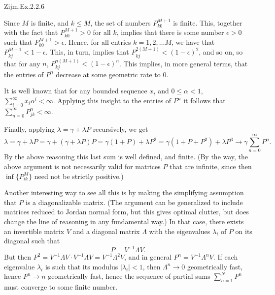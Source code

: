 \begin{question}
Zijm.Ex.2.2.6
\begin{solution}
  Since $M$ is finite, and $k\leq M$, the set of numbers
  $P^{M+1}_{k0}$ is finite. This, together with the fact that
  $P^{M+1}_{k0}>0$ for all $k$, implies that there is some number
  $\epsilon>0$ such that $P^{M+1}_{k0}>\epsilon$. Hence, for all
  entries $k=1, 2, \ldots M$, we have that
  $P^{M+1}_{kj} < 1- \epsilon$. This, in turn, implies that
  $P^{2(M+1)}_{kj} < (1- \epsilon)^2$, and so on, so that for any $n$,
  $P^{n(M+1)}_{kj} < (1- \epsilon)^n$. This implies, in more general
  terms, that the entries of $P^n$ decrease at some geometric rate to
  $0$.

  It is well known that for any bounded sequence $x_i$ and
  $0\leq \alpha < 1$, $ \sum_{i=0}^\infty x_i \alpha^i <
  \infty$. Applying this insight to the entries of $P^n$ it follows that 
$\sum_{n=0}^\infty P^n_{jk} < \infty$. 

Finally, applying  $\lambda = \gamma + \lambda P$ recursively, we get
\begin{equation*}
  \lambda = \gamma + \lambda P = \gamma + (\gamma + \lambda P)P = \gamma (1+P) + \lambda P^2 = \gamma(1+P+P^2) + \lambda P^3 \to \gamma \sum_{n=0}^\infty P^n.
\end{equation*}
By the above reasoning this last sum is well defined, and finite.  (By
the way, the above argument is not necessarily valid for matrices $P$
that are infinite, since then $\inf\{P^{M}_{ik}\}$ need not be
strictly positive.)

Another interesting way to see all this is by making the simplifying
assumption that $P$ is a diagonalizable matrix. (The argument can be
generalized to include matrices reduced to Jordan normal form, but
this gives optimal clutter, but does change the line of reasoning in
any fundamental way.) In that case, there exists an invertible matrix $V$ and a diagonal matrix $\Lambda$ with the eigenvalues $\lambda_i$ of $P$ on its diagonal such that 
\begin{equation*}
  P = V^{-1}\Lambda V.
\end{equation*}
But then
$P^2 = V^{-1}\Lambda V \cdot V^{-1}\Lambda V= V^{-1}\Lambda^2 V$, and
in general $P^n = V^{-1}\Lambda^n V$. If each eigenvalue $\lambda_i$
is such that its modulus $|\lambda_i| < 1$, then $\Lambda^n \to 0$
geometrically fast, hence $P^n\to n$ geometrically fast, hence the
sequence of partial sums $\sum_{n=1}^N P^n$ must converge to some
finite number. 


\end{solution}
\end{question}
